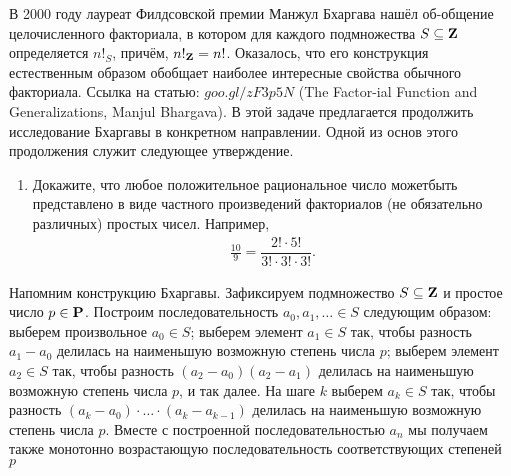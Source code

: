 
В 2000 году лауреат Филдсовской премии Манжул Бхаргава нашёл об-\linebreak общение целочисленного факториала, в котором для каждого подмножества $S\subseteq \text{\bfseries Z}$ определяется $n!_S$, причём, $n!_\text{\bfseries Z} = n!$. Оказалось, что его конструкция естественным образом обобщает наиболее интересные свойства обычного факториала. Ссылка на статью: \href{https://goo.gl/zF3p5N}{$goo.gl/zF3p5N$} (The Factor-\linebreak ial Function and Generalizations, Manjul Bhargava). В этой задаче предлагается продолжить исследование Бхаргавы в конкретном направлении. Одной из основ этого продолжения служит следующее утверждение.

\begin{enumerate}
\item Докажите, что любое положительное рациональное число может\linebreak  быть представлено в виде частного произведений факториалов (не обязательно различных) простых чисел. Например, 
\begin{align*}
\frac{10}{9} = \dfrac{2! \cdot 5!}{3! \cdot 3! \cdot 3!}.
\end{align*}
\end{enumerate}

Напомним конструкцию Бхаргавы. Зафиксируем подмножество $S \subseteq \text{\bfseries Z}$ и простое число $p \in \text{\bfseries P}$. Построим последовательность $a_0, a_1, \ldots \in S$ следующим образом: выберем произвольное $a_0 \in S$; выберем элемент $a_1 \in S$ так, чтобы разность $a_1 - a_0$ делилась на наименьшую возможную степень числа $p$; выберем элемент $a_2 \in S$ так, чтобы разность $(a_2 - a_0)(a_2 - a_1)$ делилась на наименьшую возможную степень числа $p$, и так далее. На шаге $k$ выберем $a_k \in S$ так, чтобы разность $(a_k - a_0)\cdot \ldots \cdot (a_k - a_{k-1})$ делилась на наименьшую возможную степень числа $p$. Вместе с построенной последовательностью $a_n$ мы получаем также монотонно возрастающую последовательность соответствующих степеней $p$

